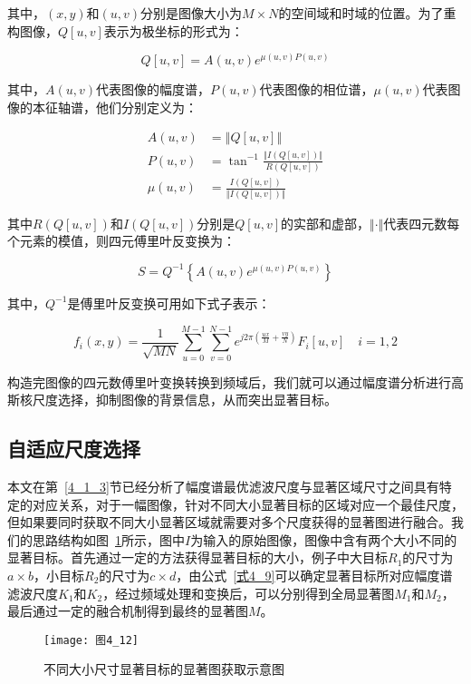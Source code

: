 其中，$(x,y)$和$(u,v)$分别是图像大小为$M×N$的空间域和时域的位置。为了重构图像，$Q[u,v]$表示为极坐标的形式为：
\begin{linenomath}
\begin{equation}
  \label{式4_19}
  Q[u,v]=A(u,v)e^{\mu(u,v) P(u,v)}
\end{equation}
\end{linenomath}
其中，$A(u,v)$代表图像的幅度谱，$P(u,v)$代表图像的相位谱，$\mu(u,v)$代表图像的本征轴谱，他们分别定义为：
\begin{linenomath}
\begin{align}
A(u,v) &= \left\Vert Q[u,v] \right\Vert \label{式4_20}\\
P(u,v) &= \tan^{-1}\frac{\left\Vert I\left(Q[u,v]\right)\right\Vert}{R\left(Q[u,v]\right)} \label{式4_21}\\
\mu(u,v) &= \frac{I\left(Q[u,v]\right)}{\left\Vert I\left(Q[u,v]\right)\right\Vert} \label{式4_22}
\end{align}
\end{linenomath}
其中$R\left(Q[u,v]\right)$和$I\left(Q[u,v]\right)$分别是$Q[u,v]$的实部和虚部，$\Vert\cdot\Vert$代表四元数每个元素的模值，则四元傅里叶反变换为：
\begin{linenomath}
\begin{equation}
  \label{式4_23}
  S=Q^{-1}\left\{A(u,v)e^{\mu(u,v)P(u,v)}\right\}
\end{equation}
\end{linenomath}
其中，$Q^{-1}$是傅里叶反变换可用如下式子表示：
\begin{linenomath}
\begin{equation}
f_i(x,y) = \frac{1}{\sqrt{MN}}\sum_{u=0}^{M-1}\sum_{v=0}^{N-1}e^{j 2\pi\left(\frac{ux}{M}+\frac{vy}{N}\right)}F_{i}[u,v]\quad i=1,2  
\label{式4_24}
\end{equation}
\end{linenomath}
构造完图像的四元数傅里叶变换转换到频域后，我们就可以通过幅度谱分析进行高斯核尺度选择，抑制图像的背景信息，从而突出显著目标。

\subsection{自适应尺度选择}
\label{4_2_2}

本文在第~\ref{4_1_3}节已经分析了幅度谱最优滤波尺度与显著区域尺寸之间具有特定的对应关系，对于一幅图像，针对不同大小显著目标的区域对应一个最佳尺度，但如果要同时获取不同大小显著区域就需要对多个尺度获得的显著图进行融合。我们的思路结构如图~\ref{图4_12}所示，图中$I$为输入的原始图像，图像中含有两个大小不同的显著目标。首先通过一定的方法获得显著目标的大小，例子中大目标$R_{1}$的尺寸为$a\times b$，小目标$R_{2}$的尺寸为$c\times d$，由公式~\ref{式4_9}可以确定显著目标所对应幅度谱滤波尺度$K_{1}$和$K_{2}$，经过频域处理和变换后，可以分别得到全局显著图$M_{1}$和$M_{2}$，最后通过一定的融合机制得到最终的显著图$M$。
\begin{figure}[h]
  \centering
  \texttt{[image: 图4\_12]}
  \caption{不同大小尺寸显著目标的显著图获取示意图}   
  \label{图4_12} 
\end{figure}

